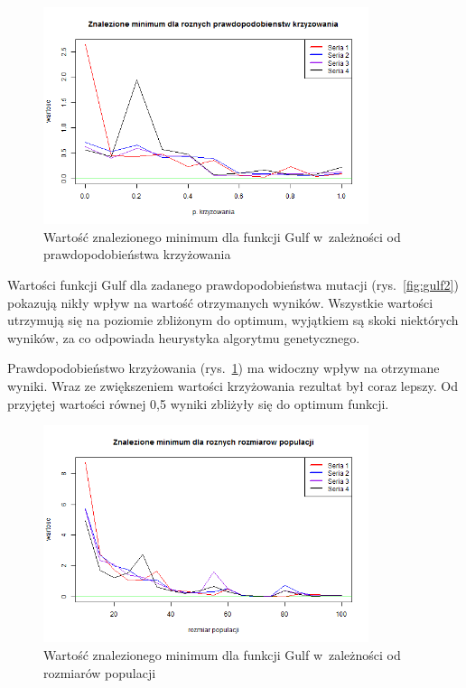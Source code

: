 \documentclass[11pt, a4paper]{article}
\newcommand{\fbi}{\leavevmode{\parindent=1em\indent}}
\begin{document}
\begin{figure}[H]
	\begin{center}
		\includegraphics[width=0.85\textwidth]{./assets/Gulf3.png}
		\caption{Wartość znalezionego minimum dla funkcji Gulf w~zależności od prawdopodobieństwa krzyżowania}
		\label{fig:gulf3}
	\end{center}
\end{figure}

\fbi
Wartości funkcji Gulf dla zadanego prawdopodobieństwa mutacji (rys.~\ref{fig:gulf2}) pokazują nikły wpływ na wartość otrzymanych wyników. Wszystkie wartości utrzymują się na poziomie zbliżonym do optimum, wyjątkiem są skoki niektórych wyników, za co odpowiada heurystyka algorytmu genetycznego.

\fbi
Prawdopodobieństwo krzyżowania (rys.~\ref{fig:gulf3}) ma widoczny wpływ na otrzymane wyniki. Wraz ze zwiększeniem wartości krzyżowania rezultat był coraz lepszy. Od przyjętej wartości równej 0,5 wyniki zbliżyły się do optimum funkcji.

\begin{figure}[H]
	\begin{center}
		\includegraphics[width=0.85\textwidth]{./assets/Gulf4.png}
		\caption{Wartość znalezionego minimum dla funkcji Gulf w~zależności od rozmiarów populacji}
		\label{fig:gulf4}
	\end{center}
\end{figure}
\end{document}
